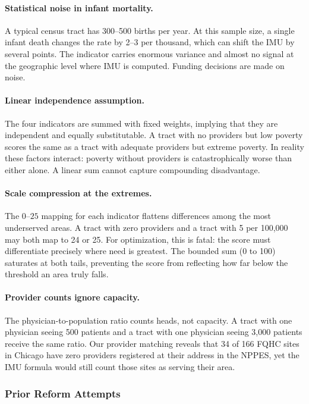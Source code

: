 \documentclass[11pt]{article}
\begin{document}
\paragraph{Statistical noise in infant mortality.}
A typical census tract has 300--500 births per year. At this sample size, a
single infant death changes the rate by 2--3 per thousand, which can shift
the IMU by several points. The indicator carries enormous variance and almost
no signal at the geographic level where IMU is computed. Funding decisions are
made on noise.

\paragraph{Linear independence assumption.}
The four indicators are summed with fixed weights, implying that they are
independent and equally substitutable. A tract with no providers but low poverty
scores the same as a tract with adequate providers but extreme poverty. In
reality these factors interact: poverty without providers is catastrophically
worse than either alone. A linear sum cannot capture compounding disadvantage.

\paragraph{Scale compression at the extremes.}
The $0$--$25$ mapping for each indicator flattens differences among the most
underserved areas. A tract with zero providers and a tract with 5 per 100,000
may both map to 24 or 25. For optimization, this is fatal: the score must
differentiate precisely where need is greatest. The bounded sum (0 to 100)
saturates at both tails, preventing the score from reflecting how far below
the threshold an area truly falls.

\paragraph{Provider counts ignore capacity.}
The physician-to-population ratio counts heads, not capacity. A tract with one
physician seeing 500 patients and a tract with one physician seeing 3,000
patients receive the same ratio. Our provider matching reveals that 34 of 166
FQHC sites in Chicago have zero providers registered at their address in the
NPPES, yet the IMU formula would still count those sites as serving their area.


\subsubsection{Prior Reform Attempts}\label{sec:imu-reform}
\end{document}
